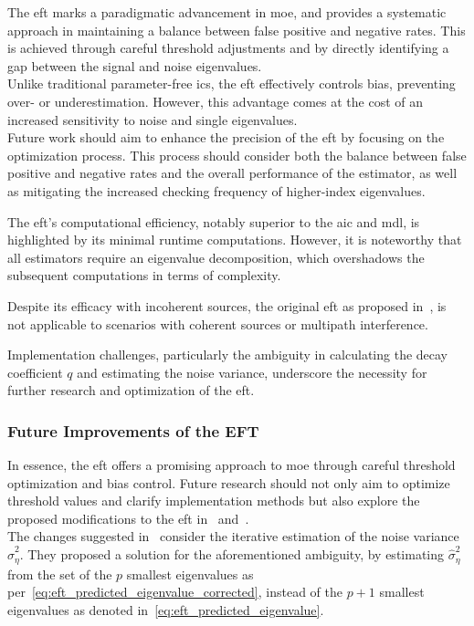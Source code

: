 The \gls{eft} marks a paradigmatic advancement in \gls{moe}, and provides a systematic approach in maintaining a balance
between false positive and negative rates.
This is achieved through careful threshold adjustments and by directly identifying a gap between the signal and noise eigenvalues. \\
Unlike traditional parameter-free \glspl{ic}, the \gls{eft} effectively controls bias, preventing over- or underestimation.
However, this advantage comes at the cost of an increased sensitivity to noise and single eigenvalues. \\
Future work should aim to enhance the precision of the \gls{eft} by focusing on the optimization process. This process
should consider both the balance between false positive and negative rates and the overall performance of the estimator,
as well as mitigating the increased checking frequency of higher-index eigenvalues.

The \gls{eft}'s computational efficiency, notably superior to the \gls{aic} and \gls{mdl}, is highlighted by its minimal
runtime computations. However, it is noteworthy that all estimators require an eigenvalue decomposition, which overshadows
the subsequent computations in terms of complexity.

Despite its efficacy with incoherent sources, the original \gls{eft} as proposed in~\cite{eft}, is not applicable to scenarios
with coherent sources or multipath interference. %

Implementation challenges, particularly the ambiguity in calculating the decay coefficient \( q \) and estimating the noise
variance, underscore the necessity for further research and optimization of the \gls{eft}.

\subsubsection{Future Improvements of the EFT}
In essence, the \gls{eft} offers a promising approach to \gls{moe} through careful threshold optimization and bias control.
Future research should not only aim to optimize threshold values and clarify implementation methods but also explore the
proposed modifications to the \gls{eft} in~\cite{costa2007} and~\cite{costa2009}. \\
The changes suggested in~\cite{costa2007} consider the iterative estimation of the noise variance \( \hat{\sigma}^2_{\eta} \).
They proposed a solution for the aforementioned ambiguity, by estimating \( \hat{\sigma}^2_{\eta} \) from the set of the
\( p \) smallest eigenvalues as per~\autoref{eq:eft_predicted_eigenvalue_corrected}, instead of the \( p + 1 \) smallest eigenvalues
as denoted in~\autoref{eq:eft_predicted_eigenvalue}.

